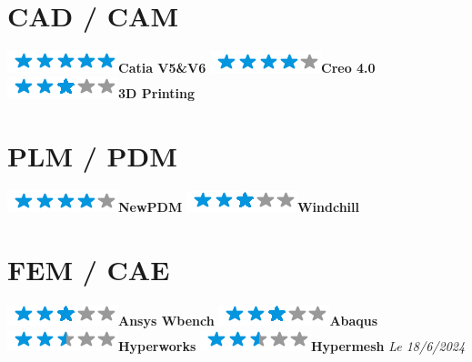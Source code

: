 \documentclass[]{friggeri-cv}
\begin{document}
\begin{aside}
\section{CAD / CAM}
\includegraphics[scale=0.40]{res/img/5stars.png}\hspace{1.5mm}\textbf{Catia V5\&V6}
\includegraphics[scale=0.40]{res/img/4stars.png}\hspace{1.5mm}\textbf{Creo 4.0}
\includegraphics[scale=0.40]{res/img/3stars.png}\hspace{1.5mm}\textbf{3D Printing}\section{PLM / PDM}
\includegraphics[scale=0.40]{res/img/4stars.png}\hspace{1.5mm}\textbf{NewPDM}
\includegraphics[scale=0.40]{res/img/3stars.png}\hspace{1.5mm}\textbf{Windchill}\section{FEM / CAE}
\includegraphics[scale=0.40]{res/img/3stars.png}\hspace{1.5mm}\textbf{Ansys Wbench}
\includegraphics[scale=0.40]{res/img/3stars.png}\hspace{1.5mm}\textbf{Abaqus}
\includegraphics[scale=0.40]{res/img/2-5stars.png}\hspace{1.5mm}\textbf{Hyperworks}
\includegraphics[scale=0.40]{res/img/2-5stars.png}\hspace{1.5mm}\textbf{Hypermesh}
\vspace{2.5mm}%
	\emph{Le 18/6/2024} \hspace*{8mm}
\end{aside}
\end{document}
